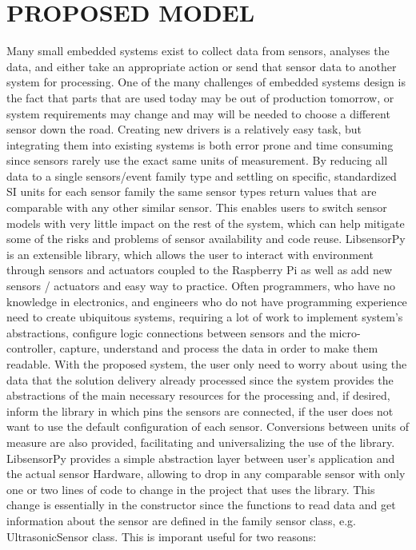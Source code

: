 \documentclass{acm_proc_article-sp}
\begin{document}
\section{PROPOSED MODEL}
Many small embedded systems exist to collect data from sensors, analyses the data, and either take an appropriate action or send that sensor data to another system for processing. One of the many challenges of embedded systems design is the fact that parts that are used today may be out of production tomorrow, or system requirements may change and may will be needed to choose a different sensor down the road.
\newline
\newline
Creating new drivers is a relatively easy task, but integrating them into existing systems is both error prone and time consuming since sensors rarely use the exact same units of measurement. By reducing all data to a single sensors/event family type and settling on specific, standardized SI units for each sensor family the same sensor types return values that are comparable with any other similar sensor. This enables users to switch sensor models with very little impact on the rest of the system, which can help mitigate some of the risks and problems of sensor availability and code reuse.
\newline
\newline
LibsensorPy is an extensible library, which allows the user to interact with environment through sensors and actuators coupled to the Raspberry Pi as well as add new sensors / actuators and easy way to practice. Often programmers, who have no knowledge in electronics, and engineers who do not have programming experience need to create ubiquitous systems, requiring a lot of work to implement system's abstractions, configure logic connections between sensors and the micro-controller, capture, understand and process the data in order to make them readable.
\newline
\newline 
With the proposed system, the user only need to worry about using the data that the solution delivery already processed since the system provides the abstractions of the main necessary resources for the processing and, if desired, inform the library in which pins the sensors are connected, if the user does not want to use the default configuration of each sensor. Conversions between units of measure are also provided, facilitating and universalizing the use of the library.
\newline
\newline 
LibsensorPy provides a simple abstraction layer between user's application and the actual sensor Hardware, allowing to drop in any comparable sensor with only one or two lines of code to change in the project that uses the library. This change is essentially in the constructor since the functions to read data and get information about the sensor are defined in the family sensor class, e.g. UltrasonicSensor class.
\newline
\newline
This is imporant useful for two reasons:
\end{document}
